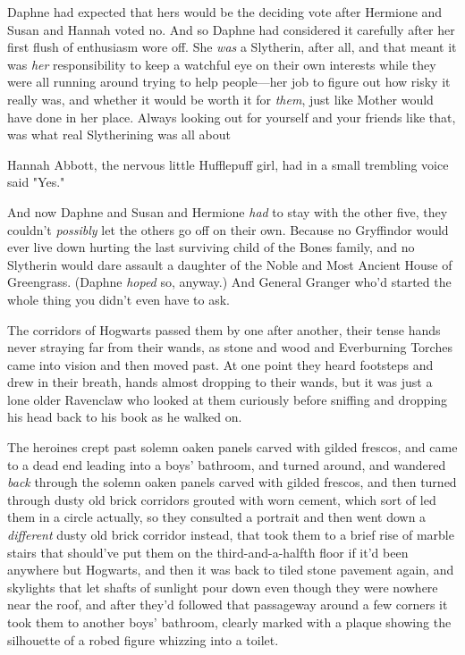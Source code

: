 Daphne had expected that hers would be the deciding vote after Hermione and
Susan and Hannah voted no. And so Daphne had considered it carefully after her
first flush of enthusiasm wore off. She \emph{was} a Slytherin, after all, and
that meant it was \emph{her} responsibility to keep a watchful eye on their own
interests while they were all running around trying to help people—her job to
figure out how risky it really was, and whether it would be worth it for
\emph{them}, just like Mother would have done in her place. Always looking out
for yourself and your friends like that, was what real Slytherining was all
about{\el}

Hannah Abbott, the nervous little Hufflepuff girl, had in a small trembling
voice said "Yes."

And now Daphne and Susan and Hermione \emph{had} to stay with the other five,
they couldn't \emph{possibly} let the others go off on their own. Because no
Gryffindor would ever live down hurting the last surviving child of the Bones
family, and no Slytherin would dare assault a daughter of the Noble and Most
Ancient House of Greengrass. (Daphne \emph{hoped} so, anyway.) And General
Granger who'd started the whole thing{\el} you didn't even have to ask.

The corridors of Hogwarts passed them by one after another, their tense hands
never straying far from their wands, as stone and wood and Everburning Torches
came into vision and then moved past. At one point they heard footsteps and
drew in their breath, hands almost dropping to their wands, but it was just a
lone older Ravenclaw who looked at them curiously before sniffing and dropping
his head back to his book as he walked on.

The heroines crept past solemn oaken panels carved with gilded frescos, and
came to a dead end leading into a boys' bathroom, and turned around, and
wandered \emph{back} through the solemn oaken panels carved with gilded
frescos, and then turned through dusty old brick corridors grouted with worn
cement, which sort of led them in a circle actually, so they consulted a
portrait and then went down a \emph{different} dusty old brick corridor
instead, that took them to a brief rise of marble stairs that should've put
them on the third-and-a-halfth floor if it'd been anywhere but Hogwarts, and
then it was back to tiled stone pavement again, and skylights that let shafts
of sunlight pour down even though they were nowhere near the roof, and after
they'd followed that passageway around a few corners it took them to another
boys' bathroom, clearly marked with a plaque showing the silhouette of a robed
figure whizzing into a toilet.

